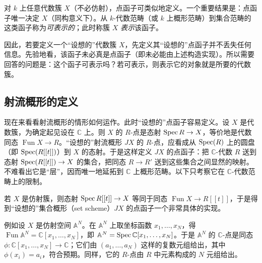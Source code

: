 对 $k$ 上任意代数簇 $X$（不必仿射），点函子可类似地定义。一个重要结果是：点函子唯一决定 $X$（同构意义下）。从 $k$-代数范畴（或 $k$ 上概形范畴）到集合范畴的这类函子称为\emph{可表示的}；此时称簇 $X$ \emph{表示}该函子。


因此，若要定义一个“设想的”代数簇 $X$，先定义其“设想的”点函子并不丢失任何信息。先验地看，该函子未必真是点函子（即未必能由上述构造实现）。所以需要回答的问题是：这个函子可表示吗？若可表示，则表示它的对象就是所要的代数簇。

\subsection{射流概形的定义}

现在来看看射流概形的情形如何运作。此时“设想的”点函子容易定义。设 $X$ 是代数簇，为确定起见设在 $\mathbb{C}$ 上。则 $X$ 的 $R$-点是态射 $\operatorname{Spec} R\to X$，等价地是代数同态 $\operatorname{Fun}X\to R$。“设想的”射流概形 $JX$ 的 $R$-点，应看成从 $\operatorname{Spec}(R)$ 上的圆盘（即 $\operatorname{Spec}(R[[t]])$）到 $X$ 的态射。于是这样定义 $JX$ 的点函子：把 $\mathbb{C}$-代数 $R$ 送到态射 $\operatorname{Spec}(R[[t]])\to X$ 的集合，把同态 $R\to R'$ 送到这些集合之间显然的映射。不难看出它是“层”，因而唯一地延拓到 $\mathbb{C}$ 上概形范畴。以下只考察它在 $\mathbb{C}$-代数范畴上的限制。

若 $X$ 是仿射簇，则态射 $\operatorname{Spec} R[[t]]\to X$ 等同于同态 $\operatorname{Fun}X\to R[[t]]$，于是得到“设想的”集合概形（set scheme）$JX$ 的点函子一个非常具体的实现。

例如设 $X$ 是仿射空间 $\mathbb{A}^N$。在 $\mathbb{A}^N$ 上取坐标函数 $x_1,\dots,x_N$，得 $\operatorname{Fun}\mathbb{A}^N=\mathbb{C}[x_1,\dots,x_N]$，即 $\mathbb{A}^N=\operatorname{Spec}\mathbb{C}[x_1,\dots,x_N]$。于是 $\mathbb{A}^N$ 的 $\mathbb{C}$-点是同态 $\phi:\mathbb{C}[x_1,\dots,x_N]\to\mathbb{C}$；它们由 $(a_1,\dots,a_N)$ 这样的复数元组给出，其中 $\phi(x_i)=a_i$，符合预期。同样，它的 $R$-点由 $R$ 中元素构成的 $N$ 元组给出。

